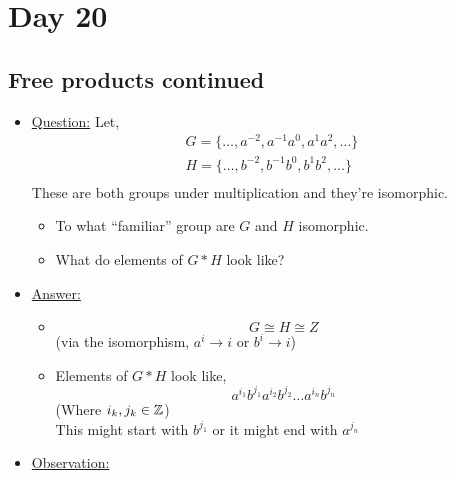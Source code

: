 \documentclass[../notes.tex]{subfiles}
\begin{document}
\section{Day 20}
\subsection{Free products continued}
\begin{itemize}
    \item \underline{Question:} Let,
        \begin{align*}
            G=\{\dots,a^{-2},a^{-1}a^{0},a^{1}a^{2},\dots \}\\
            H=\{\dots,b^{-2},b^{-1}b^{0},b^{1}b^{2},\dots \}\\
        \end{align*}
        These are both groups under multiplication and they're isomorphic.
        \begin{itemize}
            \item To what ``familiar'' group are $G$ and $H$ isomorphic.
            \item What do elements of $G*H$ look like?
        \end{itemize}
    \item \underline{Answer:}
        \begin{itemize}
            \item 
                \[
                    G\cong H \cong Z
                \]
                (via the isomorphism, $a^i\rightarrow i$ or $b^i \rightarrow i$)
            \item
                Elements of $G*H$ look like,
                \[
                    a^{i_1}b^{j_1}a^{i_2}b^{j_2}\dots a^{i_n}b^{j_n}
                \]
                (Where $i_k, j_k\in \mathbb{Z}$)\\
                This might start with $b^{j_1}$ or it might end with $a^{j_n}$
        \end{itemize}
    \item \underline{Observation:}
\end{itemize}
\end{document}

